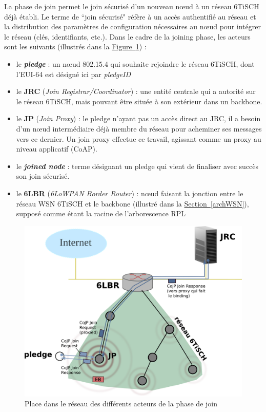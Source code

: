 \documentclass[]{report}
\newcommand{\wordlink}[2]{\hyperref[#2]{#1~\ref{#2}}}
\begin{document}
La phase de join permet le join sécurisé d'un nouveau nœud à un réseau 6TiSCH déjà établi. Le terme de ``join sécurisé" réfère à un accès authentifié au réseau et la distribution des paramètres de configuration nécessaires au nœud pour intégrer le réseau (clés, identifiants, etc.). Dans le cadre de la joining phase, les acteurs sont les suivants (illustrés dans la \wordlink{Figure}{fig:joining_phase_network}) :
\vspace{0.1cm}
\begin{itemize}[label=$\bullet$]
\item le \textit{\textbf{pledge}} : un nœud 802.15.4 qui souhaite rejoindre le réseau 6TiSCH, dont l'EUI-64 est désigné ici par \textit{pledgeID}
\item le \textbf{JRC} (\textit{Join Registrar/Coordinator}) : une entité centrale qui a autorité sur le réseau 6TiSCH, mais pouvant être située à son extérieur dans un backbone.
\item le \textbf{JP} (\textit{Join Proxy}) : le pledge n'ayant pas un accès direct au JRC, il a besoin d'un nœud intermédiaire déjà membre du réseau pour acheminer ses messages vers ce dernier. Un join proxy effectue ce travail, agissant comme un proxy au niveau applicatif (CoAP). 
\item le \textit{\textbf{joined node}} : terme désignant un pledge qui vient de finaliser avec succès son join sécurisé.
\item le \textbf{6LBR} (\textit{6LoWPAN Border Router}) : nœud faisant la jonction entre le réseau WSN 6TiSCH et le backbone (illustré dans la \wordlink{Section}{archWSN}), supposé comme étant la racine de l'arborescence RPL 
\end{itemize}

	\begin{figure}[!h]
	\centering
	\includegraphics[width=0.73\linewidth]{Joining_phase_network}
	\caption{Place dans le réseau des différents acteurs de la phase de join}
	\label{fig:joining_phase_network}
	\end{figure}
\end{document}
